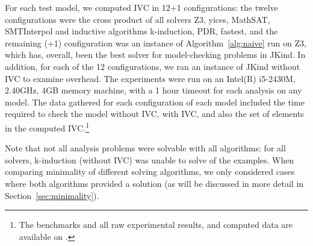 For each test model, we computed IVC in 12+1 configurations: the twelve configurations were the cross product of all solvers {Z3, yices, MathSAT, SMTInterpol} and inductive algorithms {k-induction, PDR, fastest}, and the remaining (+1) configuration was an instance of Algorithm~\ref{alg:naive} run on Z3, which has, overall, been the best solver for model-checking problems in JKind.  In addition, for each of the 12 configurations, we ran an instance of JKind without IVC to examine overhead.  The experiments were run on an Intel(R) i5-2430M, 2.40GHz, 4GB memory machine, with a 1 hour timeout for each analysis on any model.  The data gathered for each configuration of each model included the time required to check the model without IVC, with IVC, and also the set of elements in the computed IVC.\footnote{The benchmarks and all raw experimental results, and computed data are available on \cite{expr}.}  

Note that not all analysis problems were solvable with all algorithms: for all solvers, k-induction (without IVC) was unable to solve  of the examples.  When comparing minimality of different solving algorithms, we only considered cases where both algorithms provided a solution (as will be discussed in more detail in Section~\ref{sec:minimality}).

\iffalse
\begin{itemize}
    \item an algorithm to compute a truly minimal set of support, i.e. \texttt{JSupport}.
    \item given a LUS model, a static crawler which automatically marks all equations of a node in the initial support set of a property.
    \item some trackers that measure the verification time with/ without support computation.
\end{itemize}

\mike{My thoughts on this section: mostly, it needs more structure: more information on the properties of the models: size, provenance, etc., a broken out subsection on the description of the experimental setup, etc}

\mike{I think we want to split out the results in another top-level section}

Experiment:
\begin{itemize}
    \item (Overview) describe research questions and goals.
    \item Experimental setup: tell me about the models: how many, how big are they?  Then, tell me about the experiment: the tool configurations, the machine used for test.
    \item Data generation: Describe what you measured for each model analysis.
\end{itemize}
\fi

